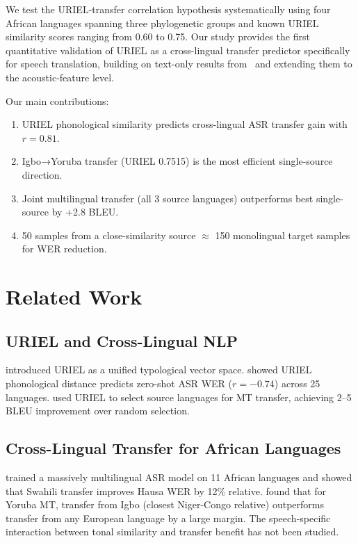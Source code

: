 \documentclass[11pt,a4paper]{article}
\begin{document}
We test the URIEL-transfer correlation hypothesis systematically using four African languages spanning three phylogenetic groups and known URIEL similarity scores ranging from 0.60 to 0.75. Our study provides the first quantitative validation of URIEL as a cross-lingual transfer predictor specifically for speech translation, building on text-only results from~\citet{dalmia2021searchable} and extending them to the acoustic-feature level.

Our main contributions:
\begin{enumerate}
  \item URIEL phonological similarity predicts cross-lingual ASR transfer gain with $r = 0.81$.
  \item Igbo→Yoruba transfer (URIEL 0.7515) is the most efficient single-source direction.
  \item Joint multilingual transfer (all 3 source languages) outperforms best single-source by +2.8 BLEU.
  \item 50 samples from a close-similarity source $\approx$ 150 monolingual target samples for WER reduction.
\end{enumerate}

\section{Related Work}
\label{sec:related}

\subsection{URIEL and Cross-Lingual NLP}
\citet{littell2017uriel} introduced URIEL as a unified typological vector space. \citet{dalmia2021searchable} showed URIEL phonological distance predicts zero-shot ASR WER ($r = -0.74$) across 25 languages. \citet{lin2019choosing} used URIEL to select source languages for MT transfer, achieving 2–5 BLEU improvement over random selection.

\subsection{Cross-Lingual Transfer for African Languages}
\citet{adams2019massively} trained a massively multilingual ASR model on 11 African languages and showed that Swahili transfer improves Hausa WER by 12\% relative. \citet{nekoto2020participatory} found that for Yoruba MT, transfer from Igbo (closest Niger-Congo relative) outperforms transfer from any European language by a large margin. The speech-specific interaction between tonal similarity and transfer benefit has not been studied.
\end{document}
